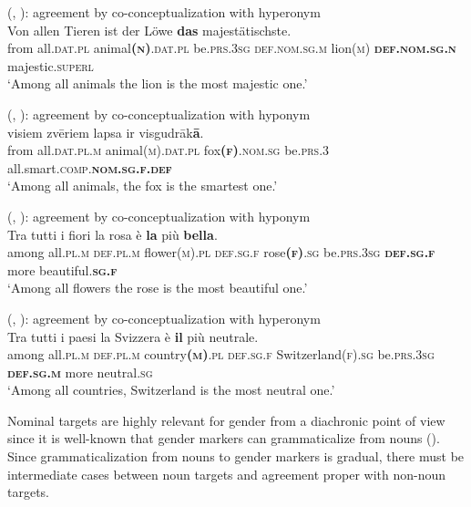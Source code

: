 \documentclass[output=collectionpaper]{langsci/langscibook}
\begin{document}
\ea\label{ex:WDG:66}
 (, ): agreement by co-conceptualization with hyperonym\\
\gll Von	allen	Tieren	ist	der	Löwe	\textbf{das} majestätischste.\\
from	all.\textsc{dat.pl}	animal\textsc{\textbf{(n)}.dat.pl}	be.\textsc{prs.3sg}	\textsc{def.nom.sg.m}	lion(\textsc{m})	\textbf{\textsc{def.nom.sg.n}} majestic.\textsc{superl}\\
\glt `Among all animals the lion is the most majestic one.'\\
\z

\ea\label{ex:WDG:67}
 (, ): agreement by co-conceptualization with hyponym\\
\gll {}	visiem	zvēriem	lapsa	ir	visgudrāk\textbf{ā}.\\
from	all.\textsc{dat.pl.m}	animal\textsc{(m).dat.pl}	fox\textsc{\textbf{(f)}.nom.sg}	be.\textsc{prs.3}	all.smart.\textsc{comp.\textbf{nom.sg.f.def}}\\
\glt `Among all animals, the fox is the smartest one.'\\
\z

\ea\label{ex:WDG:68}
 (, ): agreement by co-conceptualization with hyponym\\
\gll Tra	tutti	i	fiori	la	rosa	è	\textbf{la}	più	\textbf{bella}.\\
among	all.\textsc{pl.m}	\textsc{def.pl.m}	flower\textsc{(m).pl}	\textsc{def.sg.f}	rose\textsc{\textbf{(f)}.sg}	be.\textsc{prs.3sg}	\textbf{\textsc{def.sg.f}}	more	beautiful.\textbf{\textsc{sg.f}}\\
\glt `Among all flowers the rose is the most beautiful one.'\\
\z

\ea\label{ex:WDG:69}
 (, ): agreement by co-conceptualization with hyperonym\\
\gll Tra	tutti	i	paesi	la	Svizzera	è	\textbf{il}	più	neutrale.\\
among	all.\textsc{pl.m}	\textsc{def.pl.m}	country\textsc{\textbf{(m)}.pl}	\textsc{def.sg.f}	Switzerland\textsc{(f).sg}	be.\textsc{prs.3sg}	\textbf{\textsc{def.sg.m}}	more	neutral.\textsc{sg}\\
\glt `Among all countries, Switzerland is the most neutral one.'\\
 \z

 Nominal targets are highly relevant for gender from a diachronic point of view since it is well-known that gender markers can grammaticalize from nouns (\citealt[225]{Heine1984}). Since grammaticalization from nouns to gender markers is gradual, there must be intermediate cases between noun targets and agreement proper with non-noun targets.
\end{document}
